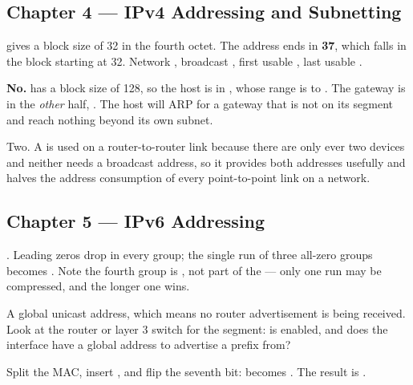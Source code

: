 \subsection*{Chapter 4 --- IPv4 Addressing and Subnetting}
\begin{tightnum}
  \item {} gives a block size of 32 in the fourth octet. The address ends
        in \textbf{37}, which falls in the block starting at 32. Network
        , broadcast , first usable
        , last usable .
  \item \textbf{No.}  has a block size of 128, so the host is in
        , whose range is  to . The
        gateway  is in the \emph{other} half,
        . The host will ARP for a gateway that is not on its
        segment and reach nothing beyond its own subnet.
  \item Two. A  is used on a router-to-router link because there are
        only ever two devices and neither needs a broadcast address, so it
        provides both addresses usefully and halves the address consumption of
        every point-to-point link on a network.
\end{tightnum}

\subsection*{Chapter 5 --- IPv6 Addressing}
\begin{tightnum}
  \item {}. Leading zeros drop in every group; the single run
        of three all-zero groups becomes \cmd{::}. Note the fourth group is
        , not part of the \cmd{::} --- only one run may be compressed, and
        the longer one wins.
  \item A global unicast address, which means no router advertisement is being
        received. Look at the router or layer 3 switch for the segment: is
         enabled, and does the interface have a global
        address to advertise a prefix from?
  \item Split the MAC, insert , and flip the seventh bit: 
        becomes . The result is .
\end{tightnum}

